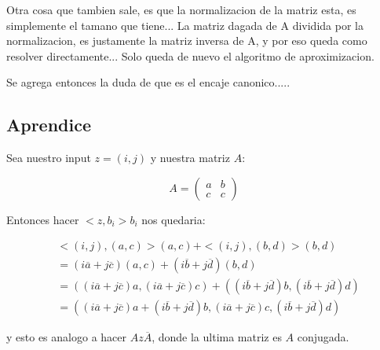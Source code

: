 \documentclass[12pt, oneside]{article}
\begin{document}
Otra cosa que tambien sale, es que la normalizacion de la matriz esta, es simplemente el tamano que tiene...
La matriz dagada de A dividida por la normalizacion, es justamente la matriz inversa de A, y por eso queda como
resolver directamente... Solo queda de nuevo el algoritmo de aproximizacion.

Se agrega entonces la duda de que es el encaje canonico.....



\subsection{Aprendice}

Sea nuestro input $z=(i, j)$ y nuestra matriz $A$:

\begin{equation*}
    A=
    \begin{pmatrix}
        a & b  \\
        c & c
    \end{pmatrix}
    \label{eq:ejA}
\end{equation*}

Entonces hacer $<z,b_i>b_i$ nos quedaria:

\begin{equation*}
    \begin{split}
        &<(i,j),(a,c)>(a,c) + <(i,j),(b,d)>(b,d) \\
        &=(i\overline{a} + j\overline{c})(a,c)+(i\overline{b} + j\overline{d})(b,d)\\
        &=((i\overline{a} + j\overline{c})a,(i\overline{a} + j\overline{c})c)+((i\overline{b} + j\overline{d})b,(i\overline{b} + j\overline{d})d)\\
        &= ((i\overline{a} + j\overline{c})a+(i\overline{b} + j\overline{d})b,(i\overline{a} + j\overline{c})c,(i\overline{b} + j\overline{d})d)
    \end{split}
    \label{eq:ej}
\end{equation*}

y esto es analogo a hacer $Az\overline{A}$, donde la ultima matriz es $A$ conjugada.
\end{document}
